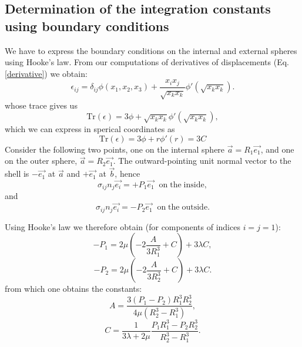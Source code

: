\documentclass[DIV=12]{article}
\newcommand{\Tr}{\mathrm{Tr}}
\begin{document}
\subsection{Determination of the integration constants using boundary conditions}
 We have to express the boundary conditions on the internal and external spheres using Hooke's law.
 From our computations of derivatives of displacements (Eq. \ref{derivative}) we obtain:\\
\begin{equation}
\epsilon_{ij} =   \delta_{ij} \phi( x_1,x_2, x_3 )  + \frac{x_i x_j}{ \sqrt{x_k x_k} } \phi'( \sqrt{x_k x_k} ).
\end{equation}
whose trace gives us
\begin{equation}
 \Tr(\epsilon) = 3\phi + \sqrt{x_k x_k} \phi'( \sqrt{x_k x_k} ),
\end{equation}
which we can express in sperical coordinates as
\begin{equation}
 \Tr(\epsilon) = 3\phi + r \phi'( r ) = 3C
\end{equation}
 Consider the following two points, one on the internal sphere $\vec{a} = R_1 \vec{e_1}$, and one on 
the outer sphere,  $\vec{a} = R_2 \vec{e_1}$. The outward-pointing unit normal vector to the shell
 is $-\vec{e_1}$ at  $\vec{a}$ and  $+\vec{e_1}$ at  $\vec{b}$, hence
\begin{equation}
 \sigma_{ij} n_j \vec{e_i} = +P_1 \vec{e_1}\;\;
 {\mathrm{on \;the \;inside}}, 
\end{equation}
and 
\begin{equation}
\sigma_{ij} n_j \vec{e_i} = -P_2 \vec{e_1}\;\;{\mathrm{on\;the\;outside.}} 
\end{equation}

 Using Hooke's law we therefore obtain (for components of indices $i=j=1$):
\begin{equation}
- P_1 =  2\mu\left( -2\frac{A}{3R_1^3} + C \right) + 3\lambda C,
\end{equation}
\begin{equation}
-P_2 =  2\mu \left(-2 \frac{A}{3R_2^3} + C\right) + 3\lambda C.
\end{equation}
from which one obtains the constants:
\begin{equation}
\boxed{A = \frac{3(P_1 - P_2)R_1^3 R_2^3}{4\mu(R_2^3 - R_1^3) },}
\end{equation}
\begin{equation}
\boxed{C = \frac{1}{3\lambda + 2\mu}\frac{P_1R_1^3 - P_2 R_2^3}{R_2^3 - R_1^3}.}
\end{equation}
\end{document}

